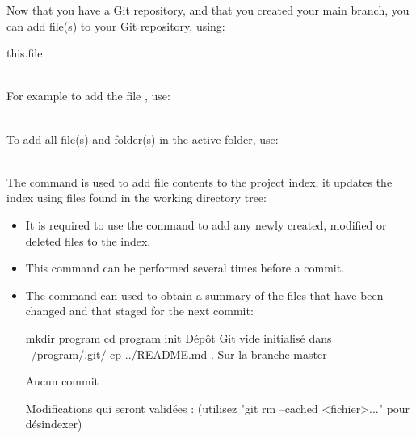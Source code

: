 Now that you have a Git repository, and that you created your main branch, you can add file(s) to your Git repository, using:
\begin{script}
   this.file
\end{script}
\\[-0.25cm]
For example to add the file , use: 
\begin{script}
   
\end{script}
\\[-0.25cm]
\noindent To add all file(s) and folder(s) in the active folder, use:
\begin{script}
   
\end{script}
\\[-0.5cm]
\noindent The   command is used to add file contents to the project index, it updates the index using files 
found in the working directory tree: 
\begin{itemize}
\item It is required to use the  command to add any newly created, modified or deleted files to the index. 
\item This command can be performed several times before a commit. 
\item The   command can used to obtain a summary of the files that have been changed and that staged for the next commit:
{\scriptsize{
\begin{scripti}
\fprompt{~} mkdir program
\fprompt{~} cd program
  init
Dépôt Git vide initialisé dans ~/program/.git/
 cp ../README.md .
   
  
Sur la branche master

Aucun commit

Modifications qui seront validées :
  (utilisez "git rm --cached <fichier>..." pour désindexer)
\end{scripti}
}}
\end{itemize}
